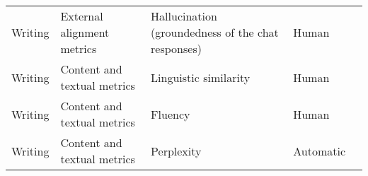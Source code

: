 \begin{small}
\begin{center}
\begin{longtable}{@{}p{}p{}p{}p{}p{}@{}}
Writing                  & External alignment metrics          & Hallucination (groundedness of the chat responses)                                                                                                                                                          & Human     & \cite{choi2024proxona}                                                                                                                                                                                                                                                                                                                                                                                                          \\
Writing                  & Content and textual metrics         & Linguistic similarity                                                                                                                                                                                       & Human     & \cite{choi2024proxona}                                                                                                                                                                                                                                                                                                                                                                                                       \\
Writing                  & Content and textual metrics         & Fluency                                                                                                                                                                                                     & Human     & \cite{mishra-etal-2023-e}                                                                                                                                                                                                                                                                                                                                                                                            \\
Writing                  & Content and textual metrics         & Perplexity                                                                                                                                                                                                  & Automatic & \cite{mishra-etal-2023-e}                                                                                                                                                                                                                                                                                                                                                                                           \\

\end{longtable}
\end{center}
\end{small}
